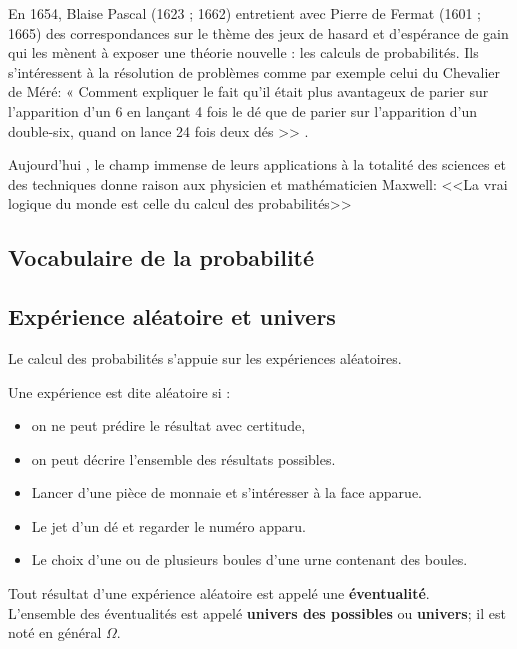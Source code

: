 
\everymath{\displaystyle}



En 1654,  Blaise Pascal (1623 ; 1662) entretient avec Pierre de Fermat (1601 ; 1665) des correspondances sur le thème des jeux de hasard et d'espérance de gain qui les mènent à exposer une théorie nouvelle : les calculs de probabilités. Ils s’intéressent à la résolution de problèmes comme par exemple celui du Chevalier de Méré: « Comment expliquer le fait qu'il était  plus avantageux de parier sur l'apparition d'un 6 en lançant 4 fois le dé  que de parier sur l'apparition d'un double-six, quand on lance 24 fois deux dés >> .


Aujourd'hui , le champ immense  de leurs applications à la totalité des sciences et des techniques donne raison aux physicien et mathématicien Maxwell: <<La vrai logique du monde est celle  du calcul des probabilités>>


\subsection{Vocabulaire de la probabilité}
\subsection*{Expérience aléatoire et univers}
Le calcul des probabilités s’appuie sur les expériences aléatoires.
\begin{definition}
 Une expérience est dite aléatoire si :
 \begin{itemize}
 \item  on ne peut prédire le résultat avec certitude,
 \item on peut décrire l’ensemble des résultats possibles.
 \end{itemize}
  \end{definition}
\begin{example}
\begin{itemize}
\item Lancer d’une pièce de monnaie et s'intéresser à la face apparue. 
\item Le jet d’un dé et regarder le  numéro apparu. 
\item Le choix d’une ou de plusieurs boules d’une urne contenant des boules. 
\end{itemize}
\end{example}
\begin{definition}
Tout résultat d’une expérience aléatoire est appelé une \textbf{ éventualité}. \\
L’ensemble des éventualités est appelé \textbf{univers des possibles } ou \textbf{univers}; il est noté en général $ \Omega $. 
\end{definition}


